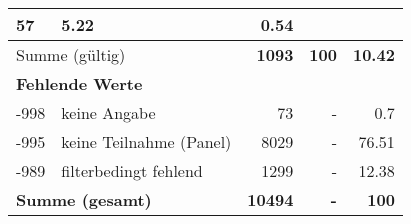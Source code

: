 \begin{longtable}{lXrrr}
       \num{57} &
       \num[round-mode=places,round-precision=2]{5,22} &
         \num[round-mode=places,round-precision=2]{0,54} \\
     \midrule
     \multicolumn{2}{l}{Summe (gültig)} &
       \textbf{\num{1093}} &
     \textbf{100} &
       \textbf{\num[round-mode=places,round-precision=2]{10,42}} \\
     \multicolumn{5}{l}{\textbf{Fehlende Werte}}\\
       -998 &
       keine Angabe &
         \num{73} &
        - &
         \num[round-mode=places,round-precision=2]{0,7} \\
       -995 &
       keine Teilnahme (Panel) &
         \num{8029} &
        - &
         \num[round-mode=places,round-precision=2]{76,51} \\
       -989 &
       filterbedingt fehlend &
         \num{1299} &
        - &
         \num[round-mode=places,round-precision=2]{12,38} \\
     \midrule
     \multicolumn{2}{l}{\textbf{Summe (gesamt)}} &
          \textbf{\num{10494}} &
        \textbf{-} &
        \textbf{100} \\
     \bottomrule
     \end{longtable}
     
